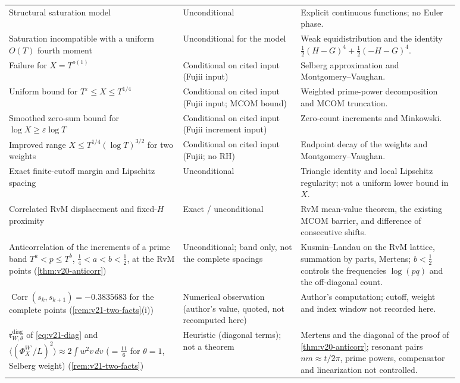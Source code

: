 \documentclass[11pt,a4paper]{article}
\numberwithin{equation}{section}
\theoremstyle{definition}
\theoremstyle{remark}
\begin{document}
\begin{longtable}{@{}p{0.34\linewidth}>{\raggedright\arraybackslash}p{0.23\linewidth}p{0.31\linewidth}@{}}
Structural saturation model & Unconditional & Explicit continuous functions; no Euler phase.\\
Saturation incompatible with a uniform $O(T)$ fourth moment & Unconditional for the model & Weak equidistribution and the identity $\tfrac12(H-G)^4+\tfrac12(-H-G)^4$.\\
Failure for $X=T^{o(1)}$ & Conditional on cited input (Fujii input) & Selberg approximation and Montgomery--Vaughan.\\
Uniform bound for $T^\varepsilon\le X\le T^{1/4}$ & Conditional on cited input (Fujii input; MCOM bound) & Weighted prime-power decomposition and MCOM truncation.\\
Smoothed zero-sum bound for $\log X\ge\varepsilon\log T$ & Conditional on cited input (Fujii increment input) & Zero-count increments and Minkowski.\\
Improved range $X\le T^{1/4}(\log T)^{3/2}$ for two weights & Conditional on cited input (Fujii; no RH) & Endpoint decay of the weights and Montgomery--Vaughan.\\
Exact finite-cutoff margin and Lipschitz spacing & Unconditional & Triangle identity and local Lipschitz regularity; not a uniform lower bound in $X$.\\
Correlated RvM displacement and fixed-$H$ proximity & Exact / unconditional & RvM mean-value theorem, the existing MCOM barrier, and difference of consecutive shifts.\\
Anticorrelation of the increments of a prime band $T^a<p\le T^b$, $\tfrac14<a<b<\tfrac12$, at the RvM points (\cref{thm:v20-anticorr}) & Unconditional; band only, not the complete spacings & Kusmin--Landau on the RvM lattice, summation by parts, Mertens; $b<\tfrac12$ controls the frequencies $\log(pq)$ and the off-diagonal count.\\
$\operatorname{Corr}(s_k,s_{k+1})=-0.3835683$ for the complete points (\cref{rem:v21-two-facts}(i)) & Numerical observation (author's value, quoted, not recomputed here) & Author's computation; cutoff, weight and index window not recorded here.\\
$\mathfrak r^{\mathrm{diag}}_{W,\theta}$ of \eqref{eq:v21-diag} and $\langle(\Phi_X^{W\prime}/L)^2\rangle\approx2\int w^2v\,dv$ ($=\tfrac{11}6$ for $\theta=1$, Selberg weight) (\cref{rem:v21-two-facts}) & Heuristic (diagonal terms); not a theorem & Mertens and the diagonal of the proof of \cref{thm:v20-anticorr}; resonant pairs $nm\approx t/2\pi$, prime powers, compensator and linearization not controlled.\\

\end{longtable}
\end{document}
